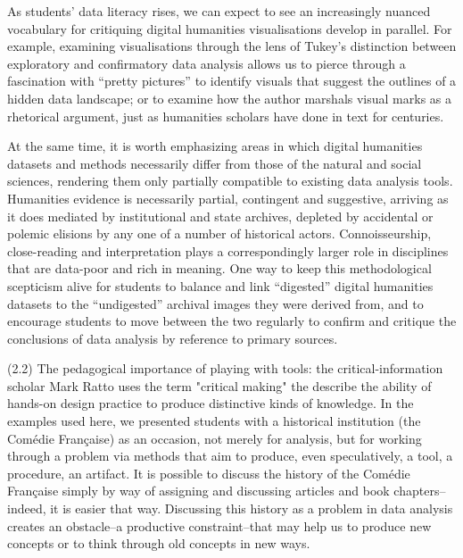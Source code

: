 \documentclass[	DIV=calc,%
							paper=a4,%
							fontsize=11pt,%
							twocolumn]{scrartcl}	 					%
\begin{document}
As students' data literacy rises, we can expect to see an increasingly nuanced vocabulary for critiquing digital humanities visualisations develop in parallel.  For example, examining visualisations through the lens of Tukey's distinction between exploratory and confirmatory data analysis allows us to pierce through a fascination with ``pretty pictures'' to identify visuals that suggest the outlines of a hidden data landscape; or to examine how the author marshals visual marks as a rhetorical argument, just as humanities scholars have done in text for centuries.

At the same time, it is worth emphasizing areas in which digital humanities datasets and methods necessarily differ from those of the natural and social sciences, rendering them only partially compatible to existing data analysis tools.  Humanities evidence is necessarily partial, contingent and suggestive, arriving as it does mediated by institutional and state archives, depleted by accidental or polemic elisions by any one of a number of historical actors.  Connoisseurship, close-reading and interpretation plays a correspondingly larger role in disciplines that are data-poor and rich in meaning.  One way to keep this methodological scepticism alive for students to balance and link ``digested'' digital humanities datasets to the ``undigested'' archival images they were derived from, and to encourage students to move between the two regularly to confirm and critique the conclusions of data analysis by reference to primary sources.

(2.2) The pedagogical importance of playing with tools: the critical-information scholar Mark Ratto uses the term "critical making" the describe the ability of hands-on design practice to produce distinctive kinds of knowledge.\cite{RATTO:2011}  In the examples used here, we presented students with a historical institution (the Comédie Française) as an occasion, not merely for analysis, but for working through a problem via methods that aim to produce, even speculatively, a tool, a procedure, an artifact.  It is possible to discuss the history of the Comédie Française simply by way of assigning and discussing articles and book chapters--indeed, it is easier that way.  Discussing this history as a problem in data analysis creates an obstacle--a productive constraint--that may help us to produce new concepts or to think through old concepts in new ways.
\end{document}
